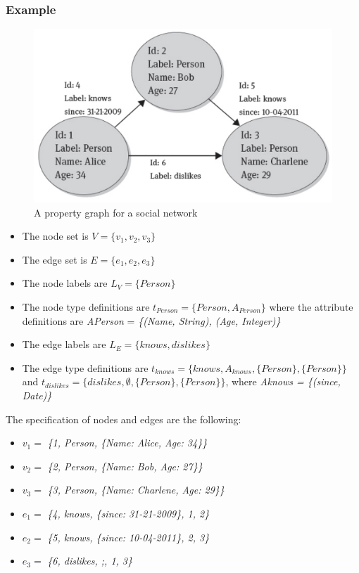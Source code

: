 \subsubsection{Example}
\begin{figure}[!h]
        \centering
        \includegraphics[width=0.7\linewidth]{images/AdvancedDataManagment/graph_databases/propriety_graph_example.jpeg}
        \caption{A property graph for a social network}
        \end{figure}
\begin{itemize}
    \item The node set is \(V = \{v_1, v_2, v_3\}\)
    \item The edge set is \(E = \{e_1, e_2, e_3\}\)
    \item The node labels are \(L_V = \{Person\}\)
    \item The node type definitions are \(t_{Person} = \{Person, A_{Person}\}\) where the attribute definitions are \textit{APerson} = \textit{\{(Name, String), (Age, Integer)\}}
    \item The edge labels are \(L_E = \{knows, dislikes\}\)
    \item The edge type definitions are \(t_{knows} = \{knows, A_{knows}, \{Person\}, \{Person\}\}\) and \(t_{dislikes} = \{dislikes, \emptyset, \{Person\}, \{Person\}\}\), where \textit{Aknows = \{(since, Date)\}}
\end{itemize}
The specification of nodes and edges are the following:
\begin{itemize}
    \item \(v_1 =\) \textit{\{1, Person, \{Name: Alice, Age: 34\}\}}
    \item \(v_2 =\) \textit{\{2, Person, \{Name: Bob, Age: 27\}\}}
    \item \(v_3 =\) \textit{\{3, Person, \{Name: Charlene, Age: 29\}\}}
    \item \(e_1 =\) \textit{\{4, knows, \{since: 31-21-2009\}, 1, 2\}}
    \item \(e_2 =\) \textit{\{5, knows, \{since: 10-04-2011\}, 2, 3\}}
    \item \(e_3 =\) \textit{\{6, dislikes, ;, 1, 3\}}
\end{itemize}

